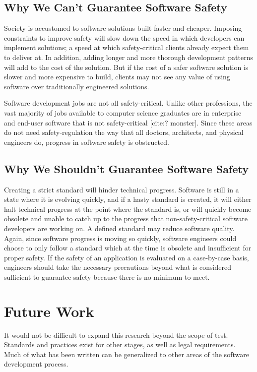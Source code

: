 \documentclass[12pt]{report}
\begin{document}
\subsection{Why We Can't Guarantee Software Safety} 
Society is accustomed to software solutions built faster and cheaper. Imposing constraints to improve safety will slow down the speed in which developers can implement solutions; a speed at which safety-critical clients already expect them to deliver at. In addition, adding longer and more thorough development patterns will add to the cost of the solution. But if the cost of a safer software solution is slower and more expensive to build, clients may not see any value of using software over traditionally engineered solutions.

Software development jobs are not all safety-critical. Unlike other professions, the vast majority of jobs available to computer science graduates are in enterprise and end-user software that is not safety-critical [cite:? monster]. Since these areas do not need safety-regulation the way that all doctors, architects, and physical engineers do, progress in software safety is obstructed. 

\subsection{Why We Shouldn't Guarantee Software Safety} 
Creating a strict standard will hinder technical progress. Software is still in a state where it is evolving quickly, and if a hasty standard is created, it will either halt technical progress at the point where the standard is, or will quickly become obsolete and unable to catch up to the progress that non-safety-critical software developers are working on. 
A defined standard may reduce software quality. Again, since software progress is moving so quickly, software engineers could choose to only follow a standard which at the time is obsolete and insufficient for proper safety. If the safety of an application is evaluated on a case-by-case basis, engineers should take the necessary precautions beyond what is considered sufficient to guarantee safety because there is no minimum to meet. 

\section{Future Work} 

It would not be difficult to expand this research beyond the scope of test. Standards and practices exist for other stages, as well as legal requirements. Much of what has been written can be generalized to other areas of the software development process. 

 
 
\end{document}
